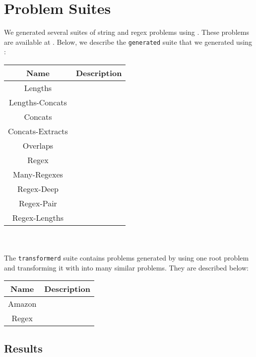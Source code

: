 \section{Problem Suites}

    We generated several suites of string and regex problems using \fuzzer{}. These problems are available at \problemRepo{}. Below, we describe the \texttt{generated} suite that we generated using \generator{}:


    \begin{tabular}{|c|c|}
        \hline
        \textbf{Name}    & \textbf{Description} \\ \hline
        Lengths          & \\ \hline
        Lengths-Concats  & \\ \hline
        Concats          & \\ \hline
        Concats-Extracts & \\ \hline
        Overlaps         & \\ \hline
        Regex            & \\ \hline
        Many-Regexes     & \\ \hline
        Regex-Deep       & \\ \hline
        Regex-Pair       & \\ \hline
        Regex-Lengths    & \\ \hline
    \end{tabular}
    \hfill \\ \\

    The \texttt{transformerd} suite contains problems generated by using one root problem and transforming it with \transformer{} into many similar problems. They are described below:


    \begin{tabular}{|c|c|}
        \hline
        \textbf{Name} & \textbf{Description} \\ \hline
        Amazon        & \\ \hline
        Regex         & \\ \hline
    \end{tabular}

    \subsection{Results}

